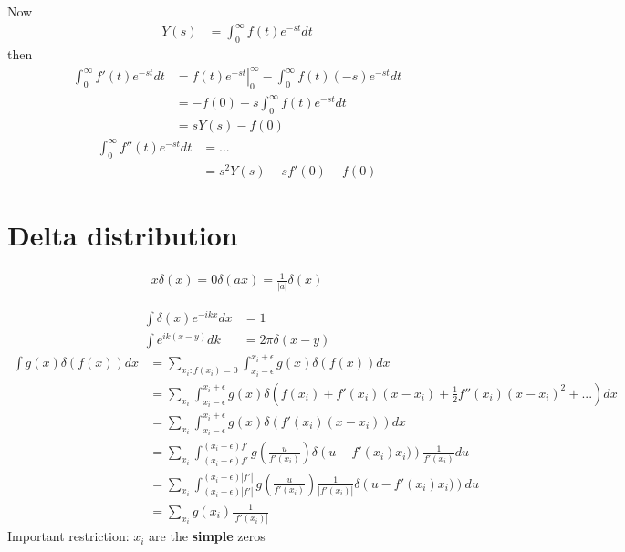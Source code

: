 \documentclass[../main.tex]{subfiles}
\begin{document}
Now
\begin{align}
Y(s)&=\int_0^\infty f(t)e^{-st}dt
\end{align}
then
\begin{align}
\int_0^\infty f'(t)e^{-st}dt
&=\left.f(t)e^{-st}\right|_0^\infty-\int_0^\infty f(t)(-s)e^{-st}dt\\
&=-f(0)+s\int_0^\infty f(t)e^{-st}dt\\
&=sY(s)-f(0)
\end{align}
\begin{align}
\int_0^\infty f''(t)e^{-st}dt
&=...\\
&=s^2Y(s)-sf'(0)-f(0)
\end{align}

\section{Delta distribution}
\begin{align}
x\delta(x)=0
\delta(ax)=\frac{1}{|a|}\delta(x)
\end{align}

\begin{align}
    \int\delta(x)e^{-ikx}dx&=1\\
    \int e^{ik(x-y)}dk&=2\pi\delta(x-y)
\end{align}
\begin{align}
    \int g(x)\delta(f(x))dx &= \sum_{x_i:f(x_i)=0}\int_{x_i-\epsilon}^{x_i+\epsilon} g(x)\delta(f(x))dx\\
    &= \sum_{x_i}\int_{x_i-\epsilon}^{x_i+\epsilon} g(x)\delta\left(f(x_i)+f'(x_i)(x-x_i)+\frac{1}{2}f''(x_i)(x-x_i)^2+...\right)dx\\
    &= \sum_{x_i}\int_{x_i-\epsilon}^{x_i+\epsilon} g(x)\delta\left(f'(x_i)(x-x_i)\right)dx\\
    &= \sum_{x_i}\int_{(x_i-\epsilon)f'}^{(x_i+\epsilon)f'} g\left(\frac{u}{f'(x_i)}\right)\delta\left(u-f'(x_i)x_i)\right)\frac{1}{f'(x_i)}du\\
    &= \sum_{x_i}\int_{(x_i-\epsilon)|f'|}^{(x_i+\epsilon)|f'|} g\left(\frac{u}{f'(x_i)}\right)\frac{1}{|f'(x_i)|}\delta\left(u-f'(x_i)x_i)\right)du\\
    &= \sum_{x_i} g(x_i)\frac{1}{|f'(x_i)|}
\end{align}
Important restriction: $x_i$ are the {\bf simple} zeros
\end{document}
